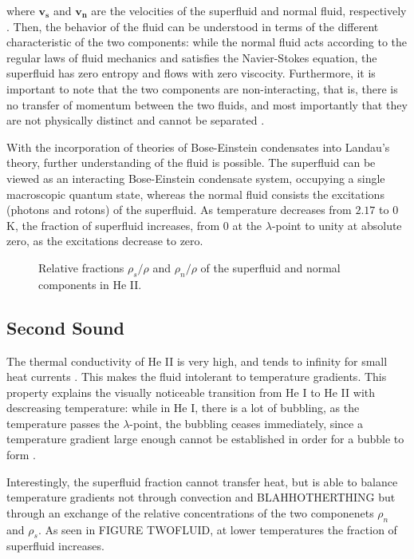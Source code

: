 where $\mathbf{v_s}$ and $\mathbf{v_n}$ are the velocities of the
superfluid and normal fluid, respectively \cite{tilley}. Then, the
behavior of the fluid can be understood in terms of the different
characteristic of the two components: while the normal fluid acts
according to the regular laws of fluid mechanics and satisfies the
Navier-Stokes equation, the superfluid has zero entropy and flows with
zero viscocity. Furthermore, it is important to note that the two
components are non-interacting, that is, there is no transfer of
momentum between the two fluids, and most importantly that they are
not physically distinct and cannot be separated \cite{tilley}.

With the incorporation of theories of Bose-Einstein condensates into
Landau's theory, further understanding of the fluid is possible. The
superfluid can be viewed as an interacting Bose-Einstein condensate
system, occupying a single macroscopic quantum state, whereas the
normal fluid consists the excitations (photons and rotons) of the
superfluid. As temperature decreases from $2.17$ to $0$ K, the
fraction of superfluid increases, from $0$ at the $\lambda$-point to
unity at absolute zero, as the excitations decrease to zero.

\begin{figure}[ht]
\begin{center}
\caption{\small{Relative fractions $\rho_s/\rho$ and $\rho_n/\rho$ of
    the superfluid and normal components in He II.}}
\label{figure:twofluid}
\end{center}
\end{figure}



\subsection{Second Sound}

The thermal conductivity of He II is very high, and tends to infinity
for small heat currents \cite{tilley}. This makes the fluid intolerant
to temperature gradients. This property explains the visually
noticeable transition from He I to He II with descreasing temperature:
while in He I, there is a lot of bubbling, as the temperature passes
the $\lambda$-point, the bubbling ceases immediately, since a
temperature gradient large enough cannot be established in order for a
bubble to form \cite{tilley}.

Interestingly, the superfluid fraction cannot transfer heat, but is
able to balance temperature gradients not through convection and
BLAHHOTHERTHING but through an exchange of the relative concentrations
of the two componenets $\rho_n$ and $\rho_s$. As seen in FIGURE
TWOFLUID, at lower temperatures the fraction of superfluid increases.

